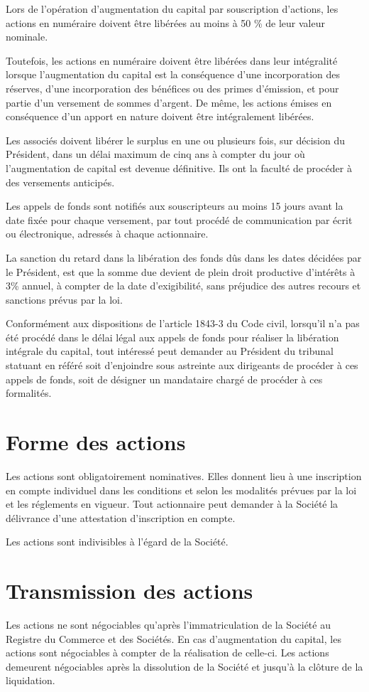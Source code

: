 \documentclass[a4paper,12pt]{report}
\begin{document}
Lors de l'opération d'augmentation du capital par souscription d'actions, les actions en numéraire doivent être libérées au moins à 50 \% de leur valeur nominale.

Toutefois, les actions en numéraire doivent être libérées dans leur intégralité lorsque l'augmentation du capital est la conséquence d'une incorporation des réserves, 
d'une incorporation des bénéfices ou des primes d'émission, et pour partie d'un versement de sommes d'argent. 
De même, les actions émises en conséquence d'un apport en nature doivent être intégralement libérées.

Les associés doivent libérer le surplus en une ou plusieurs fois, sur décision du Président, 
dans un délai maximum de cinq ans à compter du jour où l'augmentation de capital est devenue définitive. 
Ils ont la faculté de procéder à des versements anticipés.

Les appels de fonds sont notifiés aux souscripteurs au moins 15 jours avant la date fixée pour chaque versement, 
par tout procédé de communication par écrit ou électronique, adressés à chaque actionnaire.

La sanction du retard dans la libération des fonds dûs dans les dates décidées par le Président, 
est que la somme due devient de plein droit productive d'intérêts à 3\% annuel, à compter de la date d'exigibilité, 
sans préjudice des autres recours et sanctions prévus par la loi.

Conformément aux dispositions de l'article 1843-3 du Code civil, lorsqu'il n'a pas été procédé dans le délai légal aux appels de fonds 
pour réaliser la libération intégrale du capital, tout intéressé peut demander au Président du tribunal statuant en référé soit d'enjoindre sous astreinte 
aux dirigeants de procéder à ces appels de fonds, soit de désigner un mandataire chargé de procéder à ces formalités.

\section{Forme des actions}
Les actions sont obligatoirement nominatives. 
Elles donnent lieu à une inscription en compte individuel dans les conditions et selon les modalités prévues par la loi et les réglements en vigueur. 
Tout actionnaire peut demander à la Société la délivrance d'une attestation d'inscription en compte.

Les actions sont indivisibles à l'égard de la Société.

\section{Transmission des actions}
Les actions ne sont négociables qu'après l'immatriculation de la Société au Registre du Commerce et des Sociétés. 
En cas d'augmentation du capital, les actions sont négociables à compter de la réalisation de celle-ci. 
Les actions demeurent négociables après la dissolution de la Société et jusqu'à la clôture de la liquidation.
\end{document}
